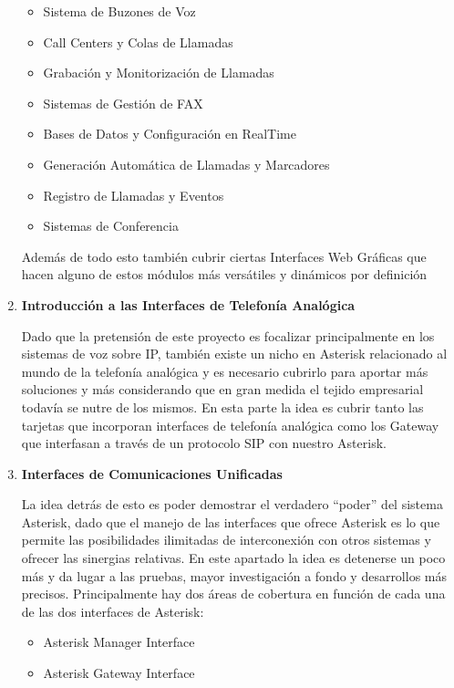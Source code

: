 \begin{enumerate}
\begin{itemize}
	  \setlength{\itemsep}{10pt}
	
		\item Sistema de Buzones de Voz
		\item Call Centers y Colas de Llamadas
		\item Grabación y Monitorización de Llamadas
		\item Sistemas de Gestión de FAX
		\item Bases de Datos y Configuración en RealTime
		\item Generación Automática de Llamadas y Marcadores
		\item Registro de Llamadas y Eventos
		\item Sistemas de Conferencia
		
	\end{itemize}
	
	Además de todo esto también cubrir ciertas Interfaces Web Gráficas que hacen alguno de estos módulos más versátiles y dinámicos por definición
	
	\item \textbf{Introducción a las Interfaces de Telefonía Analógica} 
	
	Dado que la pretensión de este proyecto es focalizar principalmente en los sistemas de voz sobre IP, también existe un nicho en Asterisk relacionado al mundo de la telefonía analógica y es necesario cubrirlo para aportar más soluciones y más considerando que en gran medida el tejido empresarial todavía se nutre de los mismos. En esta parte la idea es cubrir tanto las tarjetas que incorporan interfaces de telefonía analógica como los Gateway que interfasan a través de un protocolo SIP con nuestro Asterisk.
	
	\item \textbf{Interfaces de Comunicaciones Unificadas} 
	
	La idea detrás de esto es poder demostrar el verdadero ``poder'' del sistema Asterisk, dado que el manejo de las interfaces que ofrece Asterisk es lo que permite las posibilidades ilimitadas de interconexión con otros sistemas y ofrecer las sinergias relativas. En este apartado la idea es detenerse un poco más y da lugar a las pruebas, mayor investigación a fondo y desarrollos más precisos. Principalmente hay dos áreas de cobertura en función de cada una de las dos interfaces de Asterisk:\\
	
	\begin{itemize}
	  \setlength{\itemsep}{10pt}
		\item Asterisk Manager Interface
		\item Asterisk Gateway Interface 
	\end{itemize}


\end{enumerate}

